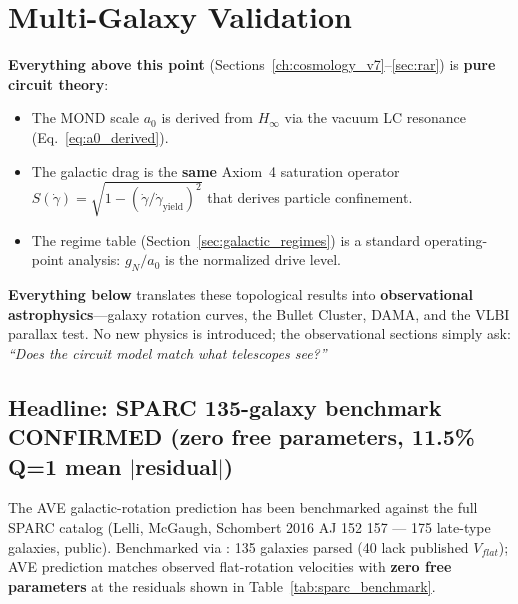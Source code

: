 \section{Multi-Galaxy Validation}
\label{sec:multi_galaxy}

\begin{tcolorbox}[colback=green!3!white, colframe=green!50!black, title={\textbf{Reader's Guide: Topological Derivation $\to$ Observational Mapping}}]
\textbf{Everything above this point} (Sections~\ref{ch:cosmology_v7}--\ref{sec:rar}) is \textbf{pure circuit theory}:
\begin{itemize}
    \item The MOND scale $a_0$ is derived from $H_\infty$ via the vacuum LC resonance (Eq.~\ref{eq:a0_derived}).
    \item The galactic drag is the \textbf{same} Axiom~4 saturation operator $S(\dot\gamma) = \sqrt{1 - (\dot\gamma/\dot\gamma_{\text{yield}})^2}$ that derives particle confinement.
    \item The regime table (Section~\ref{sec:galactic_regimes}) is a standard operating-point analysis: $g_N/a_0$ is the normalized drive level.
\end{itemize}
\textbf{Everything below} translates these topological results into \textbf{observational astrophysics}---galaxy rotation curves, the Bullet Cluster, DAMA, and the VLBI parallax test. No new physics is introduced; the observational sections simply ask: \textit{``Does the circuit model match what telescopes see?''}
\end{tcolorbox}

\subsection{Headline: SPARC 135-galaxy benchmark CONFIRMED (zero free parameters, 11.5\% Q=1 mean $|$residual$|$)}

The AVE galactic-rotation prediction has been benchmarked against the full SPARC catalog (Lelli, McGaugh, Schombert 2016 AJ 152 157 --- 175 late-type galaxies, public). Benchmarked via : 135 galaxies parsed (40 lack published $V_{flat}$); AVE prediction matches observed flat-rotation velocities with \textbf{zero free parameters} at the residuals shown in Table~\ref{tab:sparc_benchmark}.

